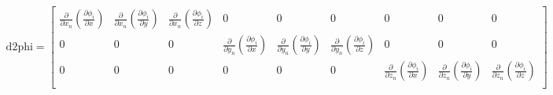 \begin{eqnarray}
\text{d2phi} = 
\begin{bmatrix}
\frac{\partial}{\partial x_n} \left(\frac{\partial \phi_i}{\partial x}\right) & \frac{\partial}{\partial x_n} \left(\frac{\partial \phi_i}{\partial y}\right) & \frac{\partial}{\partial x_n} \left(\frac{\partial \phi_i}{\partial z}\right) & 0 & 0 & 0 & 0 & 0 & 0\\
0 & 0 & 0 & \frac{\partial}{\partial y_n} \left(\frac{\partial \phi_i}{\partial x}\right) & \frac{\partial}{\partial y_n} \left(\frac{\partial \phi_i}{\partial y}\right) & \frac{\partial}{\partial y_n} \left(\frac{\partial \phi_i}{\partial z}\right) & 0 & 0 & 0 \\
0 & 0 & 0 & 0 & 0 & 0 & \frac{\partial}{\partial z_n} \left(\frac{\partial \phi_i}{\partial x}\right) & \frac{\partial}{\partial z_n} \left(\frac{\partial \phi_i}{\partial y}\right) & \frac{\partial}{\partial z_n} \left(\frac{\partial \phi_i}{\partial z}\right)  \\
\end{bmatrix} 
\end{eqnarray}
%

